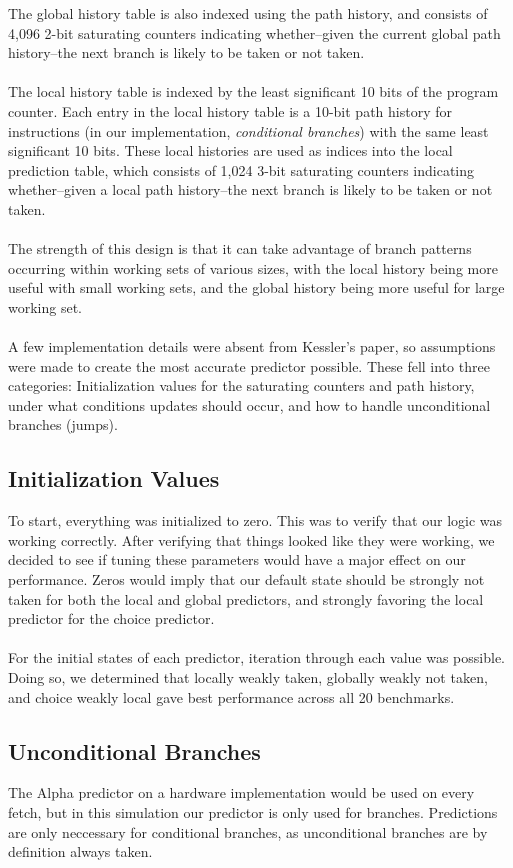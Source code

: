\documentclass[twocolumn]{article}
\begin{document}
The global history table is also indexed using the path history, and consists of 4,096 2-bit saturating counters indicating whether--given the current global path history--the next branch is likely to be taken or not taken.\\\\
The local history table is indexed by the least significant 10 bits of the program counter.  Each entry in the local history table is a 10-bit path history for instructions (in our implementation, \textit{conditional branches}) with the same least significant 10 bits.  These local histories are used as indices into the local prediction table, which consists of 1,024 3-bit saturating counters indicating whether--given a local path history--the next branch is likely to be taken or not taken.\\\\
The strength of this design is that it can take advantage of branch patterns occurring within working sets of various sizes, with the local history being more useful with small working sets, and the global history being more useful for large working set.\\\\
A few implementation details were absent from Kessler's paper, so assumptions were made to create the most accurate predictor possible.  These fell into three categories:  Initialization values for the saturating counters and path history, under what conditions updates should occur, and how to handle unconditional branches (jumps).
\subsection{Initialization Values}
To start, everything was initialized to zero. This was to verify that our logic was working correctly. After verifying that things looked like they were working, we decided to see if tuning these parameters would have a major effect on our performance. Zeros would imply that our default state should be strongly not taken for both the local and global predictors, and strongly favoring the local predictor for the choice predictor.\\\\
For the initial states of each predictor, iteration through each value was possible. Doing so, we determined that locally weakly taken, globally weakly not taken, and choice weakly local gave best performance across all 20 benchmarks.
\subsection{Unconditional Branches}
The Alpha predictor on a hardware implementation would be used on every fetch, but in this simulation our predictor is only used for branches. Predictions are only neccessary for conditional branches, as unconditional branches are by definition always taken.
\end{document}
